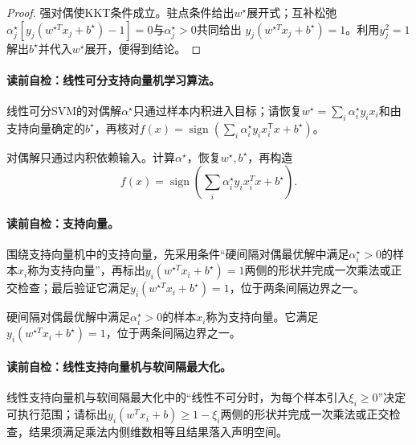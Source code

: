 \begin{proof}
强对偶使KKT条件成立。驻点条件给出$w^\star$展开式；互补松弛
$\alpha_j^\star[y_j(w^{\star T}x_j+b^\star)-1]=0$与$\alpha_j^\star>0$共同给出
$y_j(w^{\star T}x_j+b^\star)=1$。利用$y_j^2=1$解出$b^\star$并代入$w^\star$展开，便得到结论。
\end{proof}

\paragraph{读前自检：线性可分支持向量机学习算法。}线性可分SVM的对偶解$\alpha^\star$只通过样本内积进入目标；请恢复$w^\star=\sum_i\alpha_i^\star y_i x_i$和由支持向量确定的$b^\star$，再核对$f(x)=\operatorname{sign}(\sum_i\alpha_i^\star y_i x_i^{\mathsf T}x+b^\star)$。\par

对偶解只通过内积依赖输入。计算$\alpha^\star$，恢复$w^\star,b^\star$，再构造
\[
f(x)=\operatorname{sign}\left(\sum_i\alpha_i^\star y_i x_i^Tx+b^\star\right).
\]

\paragraph{读前自检：支持向量。}围绕支持向量机中的支持向量，先采用条件“硬间隔对偶最优解中满足$\alpha_i^\star>0$的样本$x_i$称为支持向量”，再标出$y_i(w^{\star T}x_i+b^\star)=1$两侧的形状并完成一次乘法或正交检查；最后验证它满足$y_i(w^{\star T}x_i+b^\star)=1$，位于两条间隔边界之一。\par

\begin{definition}[硬间隔支持向量]\label{def:V3-C02-support-vector}
硬间隔对偶最优解中满足$\alpha_i^\star>0$的样本$x_i$称为支持向量。它满足$y_i(w^{\star T}x_i+b^\star)=1$，位于两条间隔边界之一。
\end{definition}


\paragraph{读前自检：线性支持向量机与软间隔最大化。}线性支持向量机与软间隔最大化中的“线性不可分时，为每个样本引入$\xi_i\geq0$”决定可执行范围；请标出$y_i(w^Tx_i+b)\geq1-\xi_i$两侧的形状并完成一次乘法或正交检查，结果须满足乘法内侧维数相等且结果落入声明空间。\par

